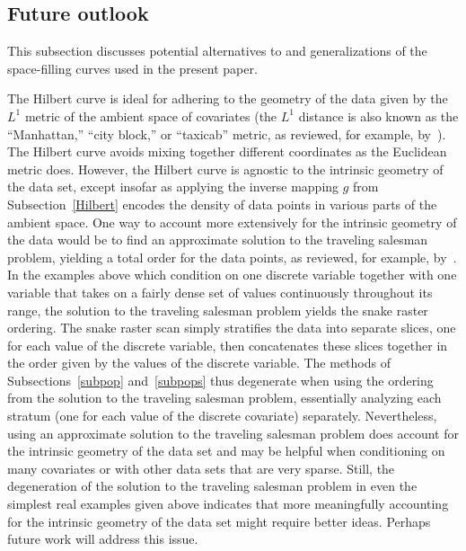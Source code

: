 \documentclass{article}
\begin{document}
\subsection{Future outlook}
\label{outlook}

This subsection discusses potential alternatives to and generalizations of
the space-filling curves used in the present paper.

The Hilbert curve is ideal for adhering to the geometry of the data given
by the $L^1$ metric of the ambient space of covariates
(the $L^1$ distance is also known as the ``Manhattan,'' ``city block,''
or ``taxicab'' metric, as reviewed, for example,
by~\cite{cormen-leiserson-rivest-stein}).
The Hilbert curve avoids mixing together different coordinates
as the Euclidean metric does.
However, the Hilbert curve is agnostic to the intrinsic geometry
of the data set, except insofar as applying the inverse mapping $g$
from Subsection~\ref{Hilbert} encodes the density of data points
in various parts of the ambient space.
One way to account more extensively for the intrinsic geometry of the data
would be to find an approximate solution to the traveling salesman problem,
yielding a total order for the data points, as reviewed, for example,
by~\cite{cormen-leiserson-rivest-stein}.
In the examples above which condition on one discrete variable
together with one variable that takes on a fairly dense set of values
continuously throughout its range, the solution
to the traveling salesman problem yields the snake raster ordering.
The snake raster scan simply stratifies the data into separate slices,
one for each value of the discrete variable, then concatenates these slices
together in the order given by the values of the discrete variable.
The methods of Subsections~\ref{subpop} and~\ref{subpops} thus degenerate
when using the ordering from the solution to the traveling salesman problem,
essentially analyzing each stratum
(one for each value of the discrete covariate) separately.
Nevertheless, using an approximate solution to the traveling salesman problem
does account for the intrinsic geometry of the data set and may be helpful
when conditioning on many covariates or with other data sets that are
very sparse. Still, the degeneration of the solution
to the traveling salesman problem in even the simplest real examples
given above indicates that more meaningfully accounting
for the intrinsic geometry of the data set might require better ideas.
Perhaps future work will address this issue.
\end{document}
